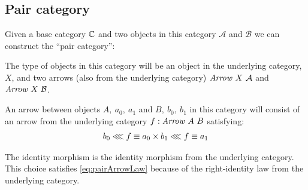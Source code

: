 \subsection{Pair category}

\newcommand\pairA{\mathcal{A}}
\newcommand\pairB{\mathcal{B}}
Given a base category $\mathbb{C}$ and two objects in this category $\pairA$ and
$\pairB$ we can construct the ``pair category'': 

The type of objects in this category will be an object in the underlying
category, $X$, and two arrows (also from the underlying category)
$\Arrow\ X\ \pairA$ and $\Arrow\ X\ \pairB$.

\newcommand\pairf{\ensuremath{f}}
\newcommand\pairFst{\mathcal{\pi_1}}
\newcommand\pairSnd{\mathcal{\pi_2}}

An arrow between objects $A ,\ a_0 ,\ a_1$ and $B ,\ b_0 ,\ b_1$ in this
category will consist of an arrow from the underlying category $\pairf \tp
\Arrow\ A\ B$ satisfying:
%
\begin{align}
\label{eq:pairArrowLaw}
b_0 \lll f \equiv a_0 \times
b_1 \lll f \equiv a_1
\end{align}

The identity morphism is the identity morphism from the underlying category.
This choice satisfies \ref{eq:pairArrowLaw} because of the right-identity law
from the underlying category.


